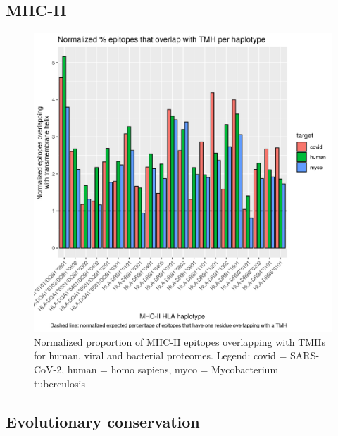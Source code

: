 

\subsection{MHC-II}

\begin{figure}[!htbp]
  \includegraphics[width=\textwidth]{bbbq_1_smart_results/fig_f_tmh_mhc2_2_normalized.png}
  \caption{
    Normalized proportion of MHC-II epitopes overlapping with TMHs
    for human, viral and bacterial proteomes.
    Legend: covid = SARS-CoV-2,
    human = homo sapiens, myco = Mycobacterium tuberculosis
  }
  \label{fig:f_tmh_mhc2_normalized}
\end{figure}



\subsection{Evolutionary conservation}

